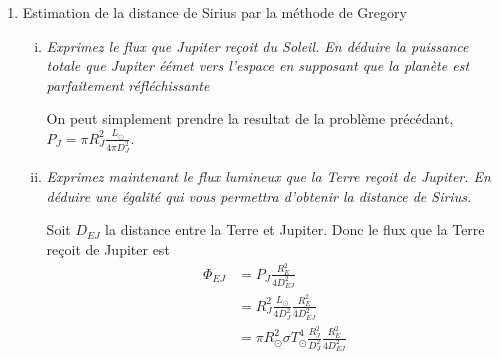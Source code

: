 \documentclass[10pt]{report}
\begin{document}
\begin{enumerate}[1)]
\begin{enumerate}[i)]
                C'est moins que la vrai temp\'erature $288^\circ \mathrm{K}$.

            \item \emph{Dotons maintenant la Terre d'une atmosph\`ere transparente \`a la lumi\`ere visible mais opaque \`a la lumi\`ere infrarouge. Ecrire le bilan radiatif du sys\`eme Terre+atpmosph\`ere et en d\'eduire la nouvelle temp\'erature d'\'equilibre de la plan\`ete.}

                On a maintenant deux \'equilibre \`a calculer. Pour l'atmosphere et la Terre respectivement
                \begin{align}
                    4\pi R_E^2\sigma T_E^4 &= 2\times 4\pi R_E^2 \sigma T_{atm}^4 & (1-\alpha)\pi R_E^2 \Phi_E + 4\pi R_E^2 \sigma T_{atm}^4 &= 4\pi R_E^2 \sigma T_E^4\label{15.9.eq1}\\
                    &&(1-\alpha)\pi R_E^2 \Phi_E + \frac{4\pi R_E^2\sigma T_E^4}{2} &= 4\pi R_E^2 \sigma T_E^4\\
                    &&2\pi R_E^2 \sigma T_E^4 &= (1-\alpha)\pi R_E^2 \Phi_E\\
                    &&T_E^4 &= \frac{(1-\alpha) T_{\odot}^4\frac{R_{\odot}^2}{D^2}}{2}\\
                    &&T_E &\approx 302
                \end{align}
                ($2\times$ \`a droit de l'\'equation \eqref{15.9.eq1} parce qu'il rayonne dans deux directions, \`a la Terre et au Soleil)
        \end{enumerate}
    \item Estimation de la distance de Sirius par la m\'ethode de Gregory
        \begin{enumerate}[i)]
            \item \emph{Exprimez le flux que Jupiter re\c{c}oit du Soleil. En d\'eduire la puissance totale que Jupiter \'e\'emet vers l'espace en supposant que la plan\`ete est parfaitement r\'efl\'echissante}

                On peut simplement prendre la resultat de la probl\`eme pr\'ec\'edant, $P_J = \pi R_J^2\frac{L_{\odot}}{4\pi D_J^2}$.
            \item \emph{Exprimez maintenant le flux lumineux que la Terre re\c{c}oit de Jupiter. En d\'eduire une \'egalit\'e qui vous permettra d'obtenir la distance de Sirius.}

                Soit $D_{EJ}$ la distance entre la Terre et Jupiter. Donc le flux que la Terre re\c{c}oit de Jupiter est
                \begin{align}
                    \Phi_{EJ} &= P_J \frac{R_E^2}{4D_{EJ}^2}\\
                    &= R_J^2\frac{L_{\odot}}{4 D_J^2}\frac{R_E^2}{4D_{EJ}^2}\\
                    &= \pi R_{\odot}^2 \sigma T_{\odot}^4\frac{R_J^2}{ D_J^2}\frac{R_E^2}{4D_{EJ}^2}
                \end{align}


\end{enumerate}
\end{enumerate}
\end{document}
